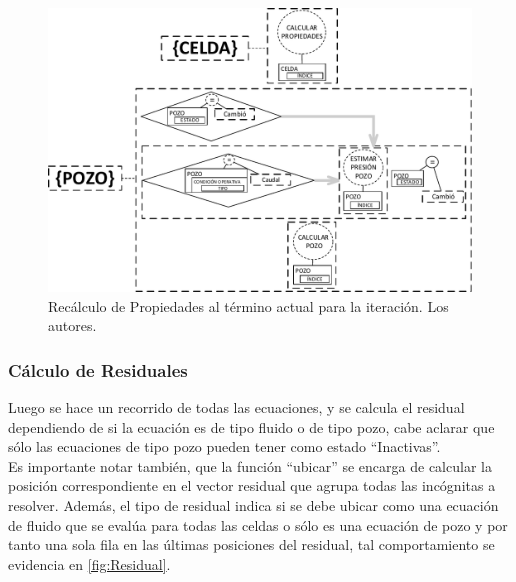 \begin{figure}[h]
	\centering%
	\includegraphics[width=\linewidth]{Fig/TiempoK.pdf}%
	\caption[Recálculo de Propiedades al término actual para la iteración.]{Recálculo de Propiedades al término actual para la iteración. Los autores.} \label{fig:TimeK}
\end{figure}

\subsubsection{Cálculo de Residuales}\label{subsec:Residual}
Luego se hace un recorrido de todas las ecuaciones, y se calcula el residual dependiendo de si la ecuación es de tipo fluido o de tipo pozo, cabe aclarar que sólo las ecuaciones de tipo pozo pueden tener como estado ``Inactivas''.\\

Es importante notar también, que la función ``ubicar'' se encarga de calcular la posición correspondiente en el vector residual que agrupa todas las incógnitas a resolver. {\color{red} Además, el tipo de residual indica si se debe ubicar como una ecuación de fluido que se evalúa para todas las celdas o sólo es una ecuación de pozo y por tanto una sola fila en las últimas posiciones del residual, tal comportamiento se evidencia} en \ref{fig:Residual}. \\ %

